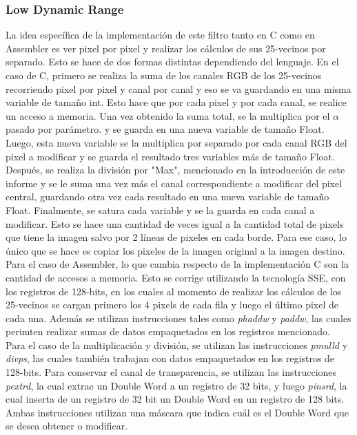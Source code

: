 \documentclass[a4paper]{article}
\begin{document}
\subsubsection{Low Dynamic Range}
La idea específica de la implementación de este filtro tanto en C como en Assembler es ver pixel por pixel y realizar los cálculos 
de sus 25-vecinos por separado. Esto se hace de dos formas distintas dependiendo del lenguaje. 
\newline 
En el caso de C, primero se realiza la suma de los canales RGB de los 25-vecinos recorriendo pixel por pixel y canal por canal y 
eso se va guardando en una misma variable de tamaño int.
Esto hace que por cada pixel y por cada canal, se realice un acceso a memoria. \newline
Una vez obtenido la suma total, se la multiplica por el $\alpha$ pasado por parámetro. y se guarda en una nueva variable de tamaño Float.
Luego, esta nueva variable se la multiplica por separado por cada canal RGB del pixel a modificar y se guarda el resultado tres variables más
de tamaño Float. Después, se realiza la división por "Max", mencionado en la introducción de este informe y se le suma una vez más el canal
correspondiente a modificar del pixel central, guardando otra vez cada resultado en una nueva variable de tamaño Float. Finalmente, 
se satura cada variable y se la guarda en cada canal a modificar. Esto se hace una cantidad de veces igual a la cantidad total de pixels 
que tiene la imagen salvo por 2 líneas de pixeles en cada borde. Para ese caso, lo único que se hace es copiar los pixeles de la imagen original 
a la imagen destino. \newline
Para el caso de Assembler, lo que cambia respecto de la implementación C son la cantidad de accesos a memoria. Esto se corrige utilizando la 
tecnología SSE, con los registros de 128-bits, en los cuales al momento de realizar los cálculos de los 25-vecinos se cargan primero los 4 pixels
de cada fila y luego el último pixel de cada una. Además se utilizan instrucciones tales como \textit{phaddw} y \textit{paddw}, las cuales
perimten realizar sumas de datos empaquetados en los registros mencionado. Para el caso de la multiplicación y división, se utilizan las instrucciones
\textit{pmulld} y \textit{divps}, las cuales también trabajan con datos empaquetados en los registros de 128-bits. Para conservar el canal de 
transparencia, se utilizan las instrucciones \textit{pextrd}, la cual extrae un Double Word a un registro de 32 bits, y luego \textit{pinsrd}, 
la cual inserta de un registro de 32 bit un Double Word en un registro de 128 bits. Ambas instrucciones utilizan una máscara que indica cuál 
es el Double Word que se desea obtener o modificar.
\newline
\end{document}

